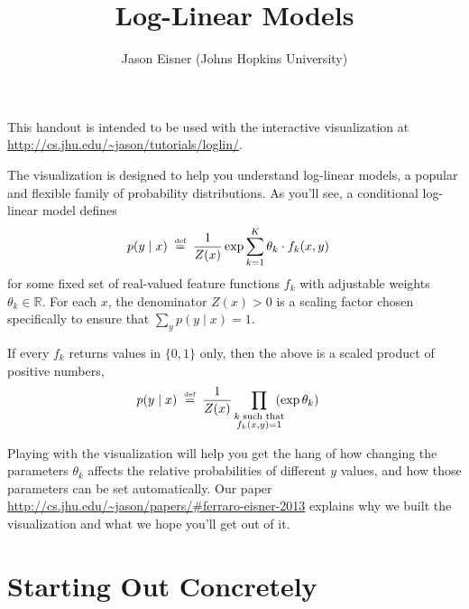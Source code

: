 \documentclass[11pt]{article}
\newcommand{\defeq}{\;\stackrel{\mbox{\tiny def}}{=}\;}
\newcommand{\Real}{{\mathbb R}}
\begin{document}
\title{\vspace{-2.3cm}Log-Linear Models}
\author{Jason Eisner (Johns Hopkins University)}
\date{}
\maketitle

\tcolorbox
\begin{small}
\begin{center}
This handout is intended to be used with the
    interactive visualization at
\url{http://cs.jhu.edu/~jason/tutorials/loglin/}.
\end{center}

The visualization is designed to help you understand log-linear
models, a popular and flexible family of probability distributions.
As you'll see, a conditional log-linear model defines
\begin{align*}
  p(y \mid x) & \defeq \frac{1}{Z(x)} \exp \sum_{k=1}^K \theta_k \cdot
                f_k(x,y)
\end{align*}
for some fixed set of real-valued feature functions $f_k$ with adjustable
weights $\theta_k \in \Real$.  For each $x$, the denominator $Z(x) >
0$ is a scaling factor chosen specifically
to ensure that $\sum_y p(y \mid x) = 1$.

\medskip
If every $f_k$ returns values in $\{0,1\}$ only, then the above is a scaled product of
positive numbers,
\begin{align*}
p(y \mid x) & \defeq \frac{1}{Z(x)} \smashoperator[r]{\prod_{\substack{k\text{
              such that} \\ f_k(x,y)=1}}} \ \ (\exp \theta_k)
\end{align*}

Playing with the visualization will help you get the hang of
how changing the parameters $\theta_k$ affects the relative
probabilities of different $y$ values, and how those parameters can be
set automatically.  Our paper
\url{http://cs.jhu.edu/~jason/papers/#ferraro-eisner-2013} explains
why we built the visualization and what we hope you'll get out of it.
\end{small}
\endtcolorbox

\section{Starting Out Concretely}\label{sec:concrete}
\end{document}
